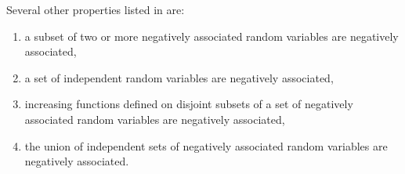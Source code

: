 Several other properties listed in \cite{JoagDev83NA} are:
\begin{enumerate}
\item a subset of two or more negatively associated random variables are negatively associated,
\item a set of independent random variables are negatively associated,
\item increasing functions defined on disjoint subsets of a set of negatively associated random variables are
negatively associated,
\item the union of independent sets of negatively associated random variables are negatively associated.
\end{enumerate}

